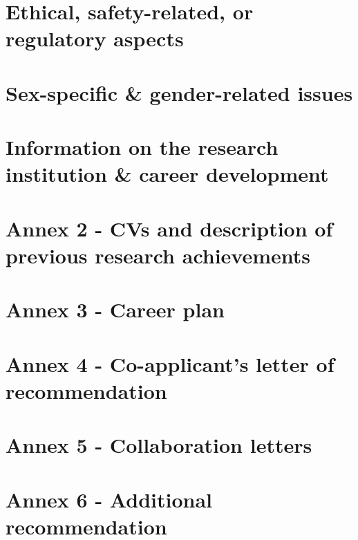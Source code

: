 \documentclass[11pt, a4paper, oneside, article]{memoir}
\begin{document}
\chapter{Ethical, safety-related, or regulatory aspects}


\chapter{Sex-specific \& gender-related issues}


\chapter{Information on the research institution \& career development}
\label{c:info_dev}


\vfill


\printglossary[type=\acronymtype,title={11 List of abbreviations}]

\newpage

\backmatter
\setcounter{page}{1}
\appendix
\printbibliography[env=bibliography, title=Annex 1 - References]
\chapter{Annex 2 - CVs and description of previous research achievements}
\chapter{Annex 3 - Career plan}
\chapter{Annex 4 - Co-applicant's letter of recommendation}
\chapter{Annex 5 - Collaboration letters}
\chapter{Annex 6 - Additional recommendation}
\end{document}
